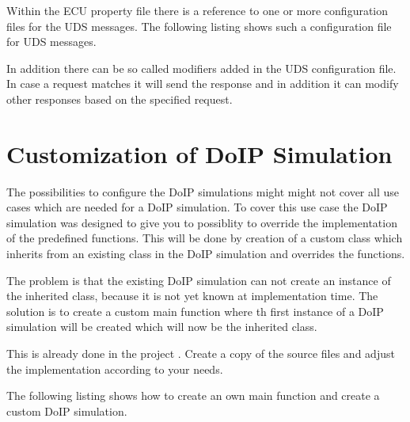 \documentclass[a4paper]{doipdoc}
\begin{document}
		

		Within the ECU property file there is a reference to one or more
		configuration files for the UDS messages. The following listing 
		shows such a configuration file for UDS messages.

		

		In addition there can be so called modifiers added in the UDS configuration
		file. In case a request matches it will send the response and in addition
		it can modify other responses based on the specified request.

		

\section{Customization of DoIP Simulation}

		The possibilities to configure the DoIP simulations might might not
		cover all use cases which are needed for a DoIP simulation. To
		cover this use case the DoIP simulation was designed to give you
		to possiblity to override the implementation of the predefined
		functions. This will be done by creation of a custom class which
		inherits from an existing class in the DoIP simulation and overrides
		the functions.

		The problem is that the existing DoIP simulation can not create
		an instance of the inherited class, because it is not yet known 
		at implementation time. The solution is to create a custom
		main function where th first instance of a DoIP simulation will 
		be created which will now be the inherited class. 

		This is already done in the project .
		Create a copy of the source files and adjust the implementation
		according to your needs.
		
		The following listing shows how to create an own main function
		and create a custom DoIP simulation.

		
		
		
\end{document}
